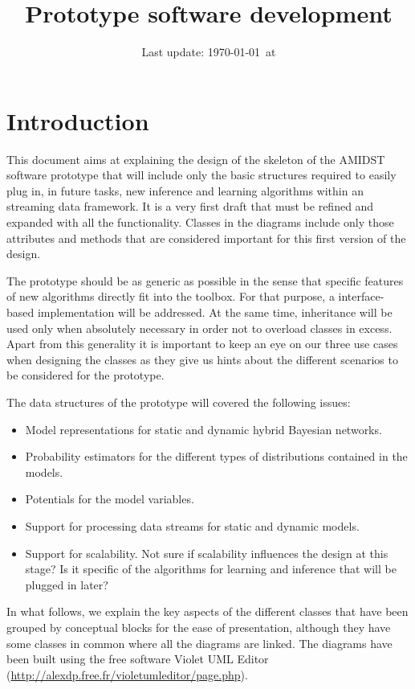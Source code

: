 \documentclass[a4paper,12pt]{article}
\title{Prototype software development}
\author{}
\date{Last update: \today~at \now}
\begin{document}
\maketitle
\tableofcontents
\section{Introduction}

This document aims at explaining the design of the skeleton of the AMIDST software 
prototype that will include only the basic structures required to easily plug in, in future 
tasks, new inference and learning algorithms within an streaming data framework.  It is
a very first draft that must be refined and expanded with all the functionality. Classes
in the diagrams include only those attributes and methods that are considered important
for this first version of the design.

The prototype should be as generic as possible in the sense that specific features 
of new algorithms directly fit into the toolbox. For that purpose, a interface-based 
implementation will be addressed. At the same time, inheritance will be used only
when absolutely necessary in order not to overload classes in excess. Apart from this 
generality it is important to keep an eye on our three use cases when designing the 
classes as they give us hints
about the different scenarios to be considered for the prototype. 

The data structures of the prototype will covered the following issues:

\begin{itemize}
\item Model representations for static and dynamic hybrid Bayesian networks.
\item Probability estimators for the different types of distributions contained in the 
models. 
\item Potentials for the model variables.
\item Support for processing data streams for static and dynamic models.
\item Support for scalability.  Not sure if scalability influences the design at this stage? Is it specific of the algorithms for learning and inference that will be plugged in later? 
\end{itemize}

In what follows, we explain the key aspects of the different classes that have 
been grouped by conceptual blocks for the ease of presentation, although they 
have some classes in common where all the diagrams are linked. The diagrams have been built using the free 
software Violet UML Editor (\url{http://alexdp.free.fr/violetumleditor/page.php}).
\end{document}
